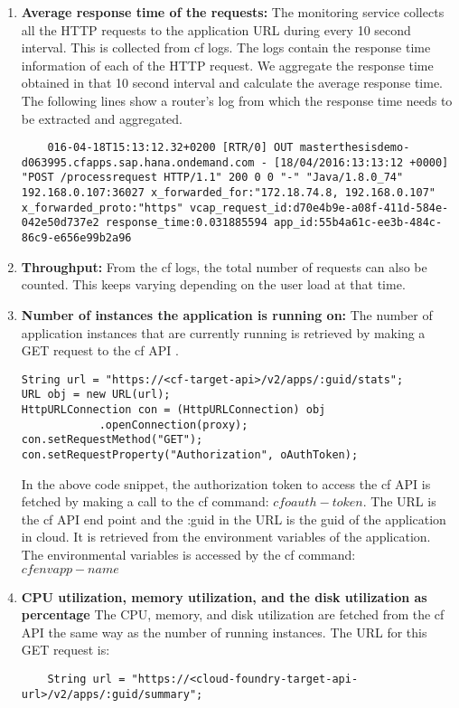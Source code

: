 \documentclass[article,type=msc,colorback,12pt,accentcolor=tud8b,table]{tudthesis}
\begin{document}
\begin{enumerate}
	\item\textbf{{Average response time of the requests:} }\newline The monitoring service collects all the HTTP requests to the application URL during every 10 second interval.  This is collected from \gls{cf} logs. The logs contain the response time information of each of the HTTP request. We aggregate the response time obtained in that 10 second interval and calculate the average response time. The following lines show a router's log from which the response time needs to be extracted and aggregated.
\begin{lstlisting}	
	016-04-18T15:13:12.32+0200 [RTR/0] OUT masterthesisdemo-d063995.cfapps.sap.hana.ondemand.com - [18/04/2016:13:13:12 +0000] "POST /processrequest HTTP/1.1" 200 0 0 "-" "Java/1.8.0_74" 192.168.0.107:36027 x_forwarded_for:"172.18.74.8, 192.168.0.107" x_forwarded_proto:"https" vcap_request_id:d70e4b9e-a08f-411d-584e-042e50d737e2 response_time:0.031885594 app_id:55b4a61c-ee3b-484c-86c9-e656e99b2a96
\end{lstlisting}	
	\item\textbf{{Throughput: }} \newline From the \gls{cf} logs, the total number of requests can also be counted. This keeps varying depending on the user load at that time. 
	
	\item\textbf{{Number of instances the application is running on:}} \newline The  number of application instances that are currently running is retrieved by making a GET request to the \gls{cf} API \cite{cf_stats}. 
\begin{lstlisting}
String url = "https://<cf-target-api>/v2/apps/:guid/stats"; 
URL obj = new URL(url);
HttpURLConnection con = (HttpURLConnection) obj
			.openConnection(proxy);
con.setRequestMethod("GET");
con.setRequestProperty("Authorization", oAuthToken);
\end{lstlisting}	
	In the above code snippet, the authorization token to access the \gls{cf} API is fetched by making a call to the cf command: $cf oauth-token$. The URL is the \gls{cf} API end point and the :guid in the URL is the \gls{guid} of the application in cloud. It is retrieved from the environment variables of the application. The environmental variables is accessed by the \gls{cf} command: $cf env app-name$
	
	\item\textbf{{CPU utilization, memory utilization, and the disk utilization as percentage}} 
	 The CPU, memory, and disk utilization are fetched from the \gls{cf} API the same way as the number of running instances. The URL for this GET request is:  \newline
	\begin{lstlisting} 
	String url = "https://<cloud-foundry-target-api-url>/v2/apps/:guid/summary"; 
	\end{lstlisting} 
	
\end{enumerate}	
	
\end{document}
